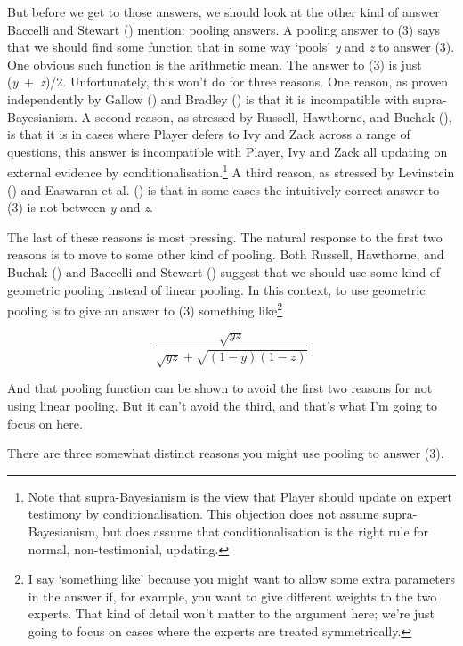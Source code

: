 \documentclass[
  10pt,
  letterpaper,
  DIV=11,
  numbers=noendperiod,
  twoside]{scrartcl}
\begin{document}
But before we get to those answers, we should look at the other kind of
answer Baccelli and Stewart ()
mention: pooling answers. A pooling answer to (3) says that we should
find some function that in some way `pools' \emph{y} and \emph{z} to
answer (3). One obvious such function is the arithmetic mean. The answer
to (3) is just (\emph{y}~+~\emph{z})/2. Unfortunately, this won't do for
three reasons. One reason, as proven independently by Gallow
() and Bradley
() is that it is incompatible with
supra-Bayesianism. A second reason, as stressed by Russell, Hawthorne,
and Buchak (), is that it is in
cases where Player defers to Ivy and Zack across a range of questions,
this answer is incompatible with Player, Ivy and Zack all updating on
external evidence by conditionalisation.\footnote{Note that
  supra-Bayesianism is the view that Player should update on expert
  testimony by conditionalisation. This objection does not assume
  supra-Bayesianism, but does assume that conditionalisation is the
  right rule for normal, non-testimonial, updating.} A third reason, as
stressed by Levinstein () and
Easwaran et al. () is that in some
cases the intuitively correct answer to (3) is not between \emph{y} and
\emph{z}.

The last of these reasons is most pressing. The natural response to the
first two reasons is to move to some other kind of pooling. Both
Russell, Hawthorne, and Buchak ()
and Baccelli and Stewart ()
suggest that we should use some kind of geometric pooling instead of
linear pooling. In this context, to use geometric pooling is to give an
answer to (3) something like\footnote{I say `something like' because you
  might want to allow some extra parameters in the answer if, for
  example, you want to give different weights to the two experts. That
  kind of detail won't matter to the argument here; we're just going to
  focus on cases where the experts are treated symmetrically.}

\[
\frac{\sqrt{yz}}{\sqrt{yz} + {\sqrt{(1-y)(1-z)}}}
\]

And that pooling function can be shown to avoid the first two reasons
for not using linear pooling. But it can't avoid the third, and that's
what I'm going to focus on here.

There are three somewhat distinct reasons you might use pooling to
answer (3).
\end{document}

